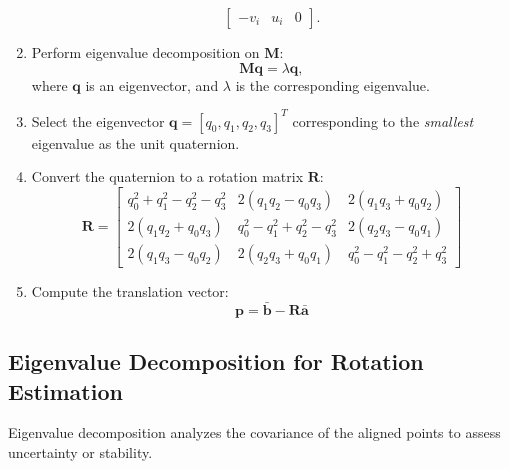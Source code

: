 \documentclass[english,10pt,a4paper]{book}
\begin{document}
\begin{enumerate}
\[\begin{bmatrix}
    		-v_i & u_i & 0
    	\end{bmatrix}.
    	\]
    	\item Perform eigenvalue decomposition on $\mathbf{M}$:
    	\[
    	\mathbf{M} \mathbf{q} = \lambda \mathbf{q},
    	\]
    	where $\mathbf{q}$ is an eigenvector, and $\lambda$ is the corresponding eigenvalue.
    	\item Select the eigenvector $\mathbf{q} = [q_0, q_1, q_2, q_3]^T$ corresponding to the \emph{smallest} eigenvalue as the unit quaternion.
    	\item Convert the quaternion to a rotation matrix $\mathbf{R}$:
    	\[
    	\mathbf{R} = \begin{bmatrix}
    		q_0^2 + q_1^2 - q_2^2 - q_3^2 & 2(q_1 q_2 - q_0 q_3) & 2(q_1 q_3 + q_0 q_2) \\
    		2(q_1 q_2 + q_0 q_3) & q_0^2 - q_1^2 + q_2^2 - q_3^2 & 2(q_2 q_3 - q_0 q_1) \\
    		2(q_1 q_3 - q_0 q_2) & 2(q_2 q_3 + q_0 q_1) & q_0^2 - q_1^2 - q_2^2 + q_3^2
    	\end{bmatrix}
    	\]
    	\item Compute the translation vector:
    	\[
    	\mathbf{p} = \bar{\mathbf{b}} - \mathbf{R} \bar{\mathbf{a}}
    	\]
    \end{enumerate}
    
    \subsection*{Eigenvalue Decomposition for Rotation Estimation}
    
    Eigenvalue decomposition analyzes the covariance of the aligned points to assess uncertainty or stability.
    
\end{document}
